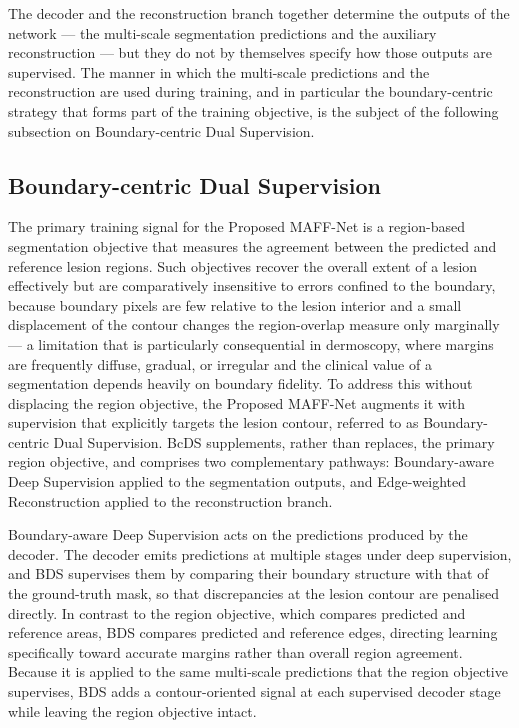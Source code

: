 The decoder and the reconstruction branch together determine the outputs of the network --- the multi-scale segmentation predictions and the auxiliary reconstruction --- but they do not by themselves specify how those outputs are supervised. The manner in which the multi-scale predictions and the reconstruction are used during training, and in particular the boundary-centric strategy that forms part of the training objective, is the subject of the following subsection on Boundary-centric Dual Supervision.

\subsection{Boundary-centric Dual Supervision}

The primary training signal for the Proposed MAFF-Net is a region-based segmentation objective that measures the agreement between the predicted and reference lesion regions. Such objectives recover the overall extent of a lesion effectively but are comparatively insensitive to errors confined to the boundary, because boundary pixels are few relative to the lesion interior and a small displacement of the contour changes the region-overlap measure only marginally --- a limitation that is particularly consequential in dermoscopy, where margins are frequently diffuse, gradual, or irregular and the clinical value of a segmentation depends heavily on boundary fidelity. To address this without displacing the region objective, the Proposed MAFF-Net augments it with supervision that explicitly targets the lesion contour, referred to as Boundary-centric Dual Supervision. BcDS supplements, rather than replaces, the primary region objective, and comprises two complementary pathways: Boundary-aware Deep Supervision applied to the segmentation outputs, and Edge-weighted Reconstruction applied to the reconstruction branch.

Boundary-aware Deep Supervision acts on the predictions produced by the decoder. The decoder emits predictions at multiple stages under deep supervision, and BDS supervises them by comparing their boundary structure with that of the ground-truth mask, so that discrepancies at the lesion contour are penalised directly. In contrast to the region objective, which compares predicted and reference areas, BDS compares predicted and reference edges, directing learning specifically toward accurate margins rather than overall region agreement. Because it is applied to the same multi-scale predictions that the region objective supervises, BDS adds a contour-oriented signal at each supervised decoder stage while leaving the region objective intact.

